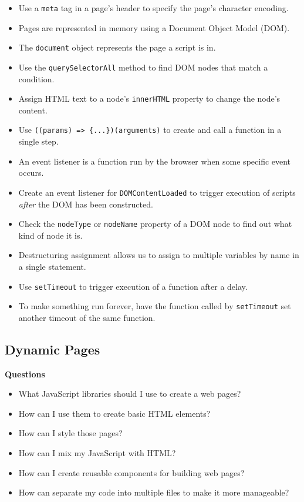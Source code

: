 \begin{itemize}
\tightlist
\item
  Use a \texttt{meta} tag in a page's header to specify the page's
  character encoding.
\item
  Pages are represented in memory using a Document Object Model (DOM).
\item
  The \texttt{document} object represents the page a script is in.
\item
  Use the \texttt{querySelectorAll} method to find DOM nodes that match
  a condition.
\item
  Assign HTML text to a node's \texttt{innerHTML} property to change the
  node's content.
\item
  Use \texttt{((params)\ =\textgreater{}\ \{...\})(arguments)} to create
  and call a function in a single step.
\item
  An event listener is a function run by the browser when some specific
  event occurs.
\item
  Create an event listener for
  \texttt{\textquotesingle{}DOMContentLoaded\textquotesingle{}} to
  trigger execution of scripts \emph{after} the DOM has been
  constructed.
\item
  Check the \texttt{nodeType} or \texttt{nodeName} property of a DOM
  node to find out what kind of node it is.
\item
  Destructuring assignment allows us to assign to multiple variables by
  name in a single statement.
\item
  Use \texttt{setTimeout} to trigger execution of a function after a
  delay.
\item
  To make something run forever, have the function called by
  \texttt{setTimeout} set another timeout of the same function.
\end{itemize}

\hypertarget{s:dynamic}{\subsection{Dynamic Pages}\label{s:dynamic}}

\textbf{Questions}

\begin{itemize}
\tightlist
\item
  What JavaScript libraries should I use to create a web pages?
\item
  How can I use them to create basic HTML elements?
\item
  How can I style those pages?
\item
  How can I mix my JavaScript with HTML?
\item
  How can I create reusable components for building web pages?
\item
  How can separate my code into multiple files to make it more
  manageable?
\end{itemize}


